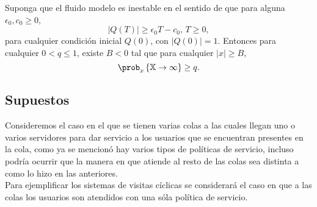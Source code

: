 \begin{Teo}\label{Tma2.2.Down}
Suponga que el fluido modelo es inestable en el sentido de que
para alguna $\epsilon_{0},c_{0}\geq0$,
\begin{equation}\label{Eq.Inestability}
|Q\left(T\right)|\geq\epsilon_{0}T-c_{0}\textrm{,   }T\geq0,
\end{equation}
para cualquier condici\'on inicial $Q\left(0\right)$, con
$|Q\left(0\right)|=1$. Entonces para cualquier $0<q\leq1$, existe
$B<0$ tal que para cualquier $|x|\geq B$,
\begin{equation}
\prob_{x}\left\{\mathbb{X}\rightarrow\infty\right\}\geq q.
\end{equation}
\end{Teo}


\subsection{Supuestos}
Consideremos el caso en el que se tienen varias colas a las cuales
llegan uno o varios servidores para dar servicio a los usuarios
que se encuentran presentes en la cola, como ya se mencion\'o hay
varios tipos de pol\'iticas de servicio, incluso podr\'ia ocurrir
que la manera en que atiende al resto de las colas sea distinta a
como lo hizo en las anteriores.\\

Para ejemplificar los sistemas de visitas c\'iclicas se
considerar\'a el caso en que a las colas los usuarios son atendidos con
una s\'ola pol\'itica de servicio.\\


